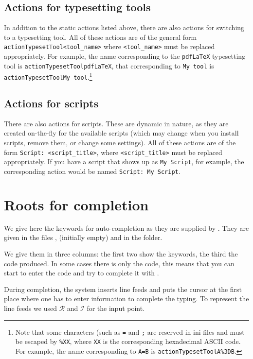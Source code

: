 \subsection{Actions for typesetting tools}
In addition to the static actions listed above, there are also actions for switching to a typesetting tool. All of these actions are of the general form \verb*|actionTypesetTool<tool_name>| where \verb*|<tool_name>| must be replaced appropriately. For example, the name corresponding to the \verb*|pdfLaTeX| typesetting tool is \verb*|actionTypesetToolpdfLaTeX|, that corresponding to \verb*|My tool| is \verb*|actionTypesetToolMy tool|.\footnote{Note that some characters (such as \verb*|=| and \verb*|;| are reserved in ini files and must be escaped by \verb*|%XX|, where \verb*|XX| is the corresponding hexadecimal ASCII code. For example, the name corresponding to \verb*|A=B| is \verb*|actionTypesetToolA%3DB|.}

\subsection{Actions for scripts}
There are also actions for scripts. These are dynamic in nature, as they are created on-the-fly for the available scripts (which may change when you install scripts, remove them, or change some settings). All of these actions are of the form \verb*|Script: <script_title>|, where \verb*|<script_title>| must be replaced appropriately. If you have a script that shows up as \verb|My Script|, for example, the corresponding action would be named \verb*|Script: My Script|.


\section{Roots for completion}
\label{sec.autocompletion}

We give here the keywords for auto-completion as they are supplied by {\Tw}. They are given in the files ,  (initially empty) and  in the  folder.

We give them in three columns: the first two show the keywords, the third the {\AllTeX} code produced. In some cases there is only the code, this means that you can start to enter the {\AllTeX} code and try to complete it with .

\newcommand{\AutoCompRet}{$\mathcal{R}$}
\newcommand{\AutoCompIns}{$\mathcal{I}$}
During completion, the system inserts line feeds and puts the cursor at the first place where one has to enter information to complete the typing. To represent the line feeds we used {\AutoCompRet} and {\AutoCompIns} for the input point. 


